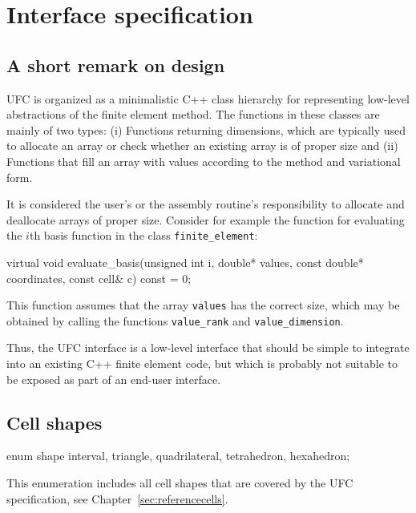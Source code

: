 \chapter{Interface specification}
\label{sec:interface}


\section{A short remark on design}

UFC is organized as a minimalistic C++ class hierarchy for
representing low-level abstractions of the finite element method. The
functions in these classes are mainly of two types: (i) Functions
returning dimensions, which are typically used to allocate an array or
check whether an existing array is of proper size and (ii) Functions
that fill an array with values according to the method and variational
form.

It is considered the user's or the assembly routine's
responsibility to allocate and deallocate arrays of proper size.
Consider for example the function for evaluating the $i$th basis
function in the class \texttt{finite\_element}:
\begin{code}
virtual void evaluate_basis(unsigned int i, double* values,
                            const double* coordinates,
                            const cell& c) const = 0;
\end{code}
This function assumes that the array \texttt{values} has the 
correct size, which may be obtained by calling the functions
\texttt{value\_rank} and \texttt{value\_dimension}.

Thus, the UFC interface is a low-level interface that should be simple
to integrate into an existing C++ finite element code, but which is
probably not suitable to be exposed as part of an end-user interface.

\section{Cell shapes}

\begin{code}
enum shape {interval,
            triangle, quadrilateral,
            tetrahedron, hexahedron};
\end{code}

This enumeration includes all cell shapes that are covered by the UFC
specification, see Chapter~\ref{sec:referencecells}.

